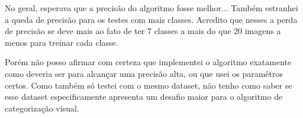 No geral, esperava que a precisão do algoritmo fosse melhor... Também estranhei a queda de precisão para os testes
com mais classes. Acredito que nesses a perda de precisão se deve mais ao fato de ter 7 classes a mais do que 20
imagens a menos para treinar cada classe. 

Porém não posso afirmar com certeza que implementei o algoritmo exatamente como deveria ser para alcançar uma 
precisão alta, ou que usei os paramêtros certos. Como também só testei com o mesmo dataset, não tenho como saber
se esse dataset especificamente apresenta um desafio maior para o algoritmo de categorização visual.



